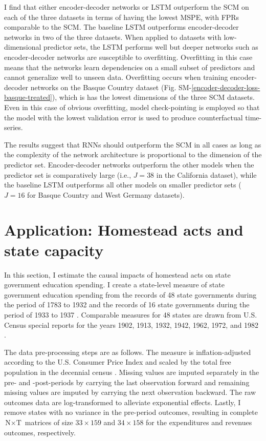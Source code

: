 \documentclass[hidelinks,12pt]{article}
\begin{document}
I find that either encoder-decoder networks or LSTM outperform the SCM on each of the three datasets in terms of having the lowest MSPE, with FPRs comparable to the SCM. The baseline LSTM outperforms encoder-decoder networks in two of the three datasets. When applied to datasets with low-dimensional predictor sets, the LSTM performs well but deeper networks such as encoder-decoder networks are susceptible to overfitting. Overfitting in this case means that the networks learn dependencies on a small subset of predictors and cannot generalize well to unseen data. Overfitting occurs when training encoder-decoder networks on the Basque Country dataset (Fig. SM-\ref{encoder-decoder-loss-basque-treated}), which is has the lowest dimensions of the three SCM datasets. Even in this case of obvious overfitting, model check-pointing is employed so that the model with the lowest validation error is used to produce counterfactual time-series.

The results suggest that RNNs should outperform the SCM in all cases as long as the complexity of the network architecture is proportional to the dimension of the predictor set. Encoder-decoder networks outperform the other models when the predictor set is comparatively large (i.e., $J=38$ in the California dataset), while the baseline LSTM outperforms all other models on smaller predictor sets ($J=16$ for Basque Country and West Germany datasets). 

\section{Application: Homestead acts and state capacity} \label{state-capacity}

In this section, I estimate the causal impacts of homestead acts on state government education spending. I create a state-level measure of state government education spending from the records of 48 state governments during the period of 1783 to 1932 \citep{sylla1993sources} and the records of 16 state governments during the period of 1933 to 1937 \citep{sylla1995sourcesa,sylla1995sourcesb}. Comparable measures for 48 states are drawn from U.S. Census special reports for the years 1902, 1913, 1932, 1942, 1962, 1972, and 1982 \citep{haines2010}.

The data pre-processing steps are as follows. The measure is inflation-adjusted according to the U.S. Consumer Price Index \citep{williamson2017seven} and scaled by the total free population in the decennial census \citep{haines2010}. Missing values are imputed separately in the pre- and -post-periods by carrying the last observation forward and remaining missing values are imputed by carrying the next observation backward. The raw outcomes data are log-transformed to alleviate exponential effects. Lastly, I remove states with no variance in the pre-period outcomes, resulting in complete $\text{N} \times \text{T}$ matrices of size $33 \times 159$ and $34 \times 158$ for the expenditures and revenues outcomes, respectively. 
\end{document}
